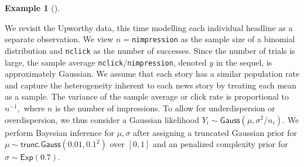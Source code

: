 \documentclass[
  11pt,
  letterpaper,
]{scrbook}
\theoremstyle{definition}
\newtheorem{example}{Example}[chapter]
\theoremstyle{plain}
\theoremstyle{plain}
\theoremstyle{plain}
\theoremstyle{definition}
\theoremstyle{definition}
\theoremstyle{plain}
\theoremstyle{plain}
\theoremstyle{remark}
\begin{document}
\begin{example}[]\protect\hypertarget{exm-normal-question-upworthy}{}\label{exm-normal-question-upworthy}

We revisit the Upworthy data, this time modelling each individual
headline as a separate observation. We view \(n=\)\texttt{nimpression}
as the sample size of a binomial distribution and \texttt{nclick} as the
number of successes. Since the number of trials is large, the sample
average \texttt{nclick}/\texttt{nimpression}, denoted \(y\) in the
sequel, is approximately Gaussian. We assume that each story has a
similar population rate and capture the heterogeneity inherent to each
news story by treating each mean as a sample. The variance of the sample
average or click rate is proportional to \(n^{-1},\) where \(n\) is the
number of impressions. To allow for underdispersion or overdispersion,
we thus consider a Gaussian likelihood
\(Y_i \sim \mathsf{Gauss}(\mu, \sigma^2/n_i).\) We perform Bayesian
inference for \(\mu, \sigma\) after assigning a truncated Gaussian prior
for \(\mu \sim \mathsf{trunc. Gauss}(0.01, 0.1^2)\) over \([0,1]\) and
an penalized complexity prior for \(\sigma \sim \mathsf{Exp}(0.7).\)


\end{example}
\end{document}
